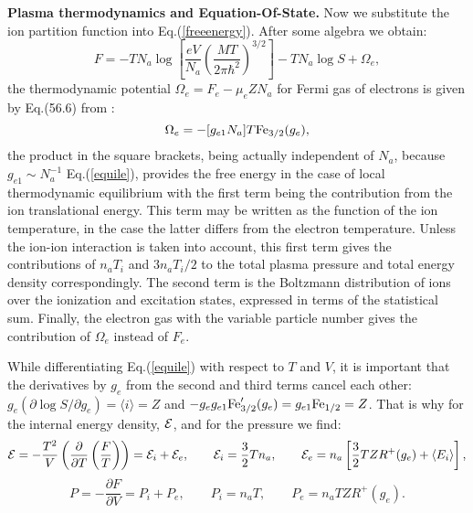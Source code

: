 {\bf Plasma thermodynamics and Equation-Of-State.} Now we substitute the ion partition function into Eq.(\ref{freeenergy}). After some algebra we obtain:
\begin{equation}\label{equile}
F = -TN_a\log\left[\frac{eV}{N_a}\left(\frac{MT}{2\pi \hbar^2}\right)^{3/2}\right]-TN_a\log S +\Omega_e,
\end{equation}
the thermodynamic potential $\Omega_e=F_e -\mu_eZN_a$ for Fermi gas of electrons is given by Eq.(56.6) from \cite{ll}:
\begin{equation}
\Omega_e = -[g_{e1}N_a]T{\rm Fe}_{3/2}(g_e),
\end{equation}
the product in the square brackets, being actually independent of $N_a$, because $g_{e1}\sim N_a^{-1}$ Eq.(\ref{equile}), provides the free energy in the case of
local thermodynamic equilibrium with the first term being the contribution from the ion translational energy. This term may be written as the function of the ion 
temperature, in the case the latter differs from the electron temperature. Unless the ion-ion interaction is taken into account, this first term gives the contributions 
of $n_aT_i$ and $3n_aT_i/2$ to the total plasma pressure and total energy density correspondingly. The second term is
the Boltzmann distribution of ions over the ionization and excitation states, expressed in terms of the statistical sum. Finally, the electron gas with the
variable particle number gives the contribution of $\Omega_e$ instead of $F_e$. 

While differentiating Eq.(\ref{equile}) with respect to $T$ and $V$, it is important that the derivatives
by $g_e$ from the second and third terms cancel 
each other: $g_e(\partial \log S/\partial g_e)=\langle i\rangle=Z$ and $-g_eg_{e1}{\rm Fe}^\prime_{3/2}(g_e)=g_{e1}{\rm Fe}_{1/2}=Z$. That is why for the internal energy density, 
${\cal E}$, and for the pressure we find:
\begin{equation}
{\cal E} = -\frac{T^2}V\left(\frac{\partial}{\partial T}\left(\frac F T\right)\right)=
{\cal E}_i+{\cal E}_e,\qquad{\cal E}_i=\frac32Tn_a,
\qquad{\cal E}_e=n_a\left[\frac32TZR^+(g_e)+\langle E_i\rangle\right],
\end{equation}
\begin{equation}
P = -\frac{\partial F}{\partial V}=P_i+P_e,\qquad
P_i = n_aT,\qquad
P_e = n_aTZR^+(g_e).
\end{equation}

